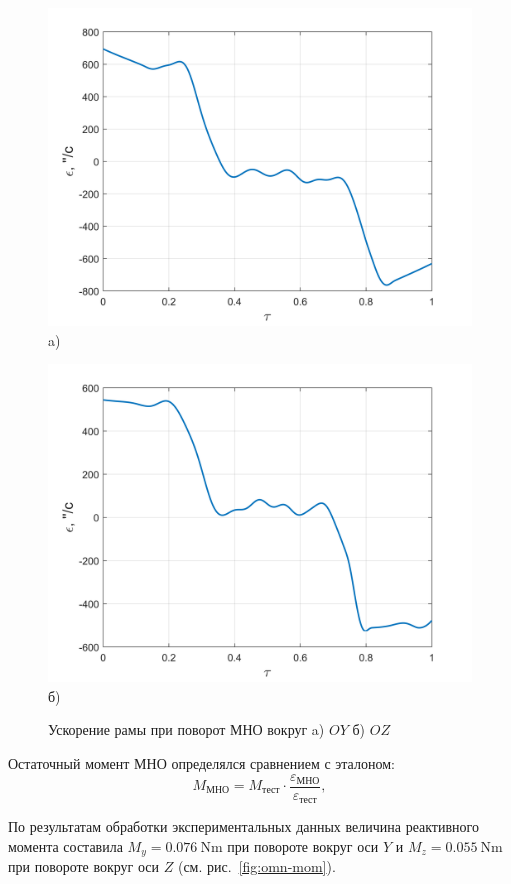 \begin{figure}[!h]
	\begin{minipage}[b]{0.49\linewidth}\centering
		\includegraphics[width=0.8\linewidth]{matlab/img/oy-gyro-acc.png}\\[-2pt] a)
	\end{minipage}
	\hfill
	\begin{minipage}[b]{0.49\linewidth}\centering
		\includegraphics[width=0.8\linewidth]{matlab/img/oz-gyro-acc.png}\\[-2pt] б)
	\end{minipage}
	\caption{Ускорение рамы при поворот МНО вокруг a) $OY$ б) $OZ$}
	\label{fig:oz-gyro}
\end{figure}

Остаточный момент МНО определялся сравнением с эталоном:
\[
M_{\text{МНО}} = M_{\text{тест}}\cdot\frac{\varepsilon_{\text{МНО}}}{\varepsilon_{\text{тест}}}\!,
\]

По результатам обработки экспериментальных данных величина реактивного момента составила $M_y = \SI{0,076}{\newton\meter}$ при повороте вокруг оси $Y$ и $M_z = \SI{0,055}{\newton\meter}$ при повороте вокруг оси $Z$ (см. рис.~\cref{fig:omn-mom}).

